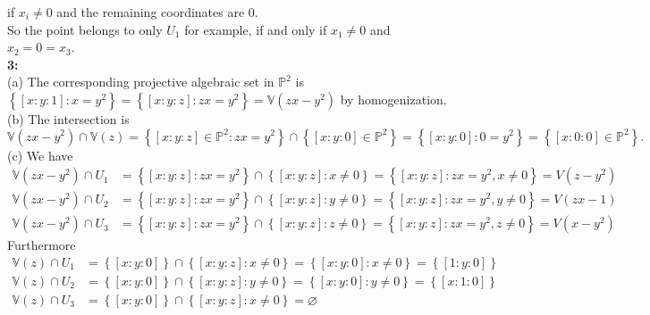 \documentclass[a4paper]{article}
\begin{document}
    if  $x_i \neq 0$ and the remaining coordinates are $0$.\\
   So the point belongs to only $U_1$ for example, if 
   and only if
   $x_1 \neq 0$ and $x_2 = 0 = x_3$.\\
   \linebreak
   \textbf{3:} \\
   (a) The corresponding projective algebraic set in $\mathbb{P}^2$ 
   is $\left\{ \left[ x  \colon y  \colon 1 \right]  \colon
   x = y^2 \right\} =
   \left\{ \left[ x  \colon y  \colon z \right]  \colon
   z x = y^2 \right\} =
   \mathbb{V} \left( zx - y^2 \right) $ by homogenization.\\
   \linebreak
   (b) The intersection is
   \[
   \mathbb{V}(zx - y^2) \cap \mathbb{V}(z) =
   \left\{ \left[ x  \colon y  \colon z \right]  \in \mathbb{P}^2  \colon
   zx = y^2     \right\} \cap \left\{ \left[ x  \colon y  \colon 0 \right] \in
   \mathbb{P}^2 \right\} 
   = \left\{ \left[ x \colon y  \colon 0 \right]  \colon
   0 = y^2 \right\} =
   \left\{ \left[ x  \colon 0  \colon 0 \right] \in \mathbb{P}^2 \right\}.
   \] 
   (c) 
   We have
   \begin{align*}
       \mathbb{V}(zx - y^2) \cap U_1
       &= \left\{ \left[ x  \colon y  \colon z \right]  \colon
       zx = y^2 \right\} \cap \left\{ \left[ x \colon y  \colon z \right]  \colon
       x \neq  0 \right\} 
       = \left\{ \left[ x  \colon y  \colon z \right]  \colon
       zx = y^2 , x \neq 0 \right\}
       = V \left( z - y^2 \right) \\
       \mathbb{V}(zx - y^2) \cap U_2
       &= \left\{ \left[ x  \colon y  \colon z \right]  \colon
       zx = y^2 \right\} \cap \left\{ \left[ x \colon y  \colon z \right]  \colon
       y \neq  0 \right\} 
       = \left\{ \left[ x  \colon y  \colon z \right]  \colon
       zx = y^2 , y \neq 0 \right\}
       = V\left( zx - 1 \right) \\
       \mathbb{V}(zx - y^2) \cap U_3
       &= \left\{ \left[ x  \colon y  \colon z \right]  \colon
       zx = y^2 \right\} \cap \left\{ \left[ x \colon y  \colon z \right]  \colon
       z \neq  0 \right\} 
       = \left\{ \left[ x  \colon y  \colon z \right]  \colon
       zx = y^2 , z \neq 0 \right\}
       = V\left( x - y^2 \right) 
   \end{align*}
   Furthermore
   \begin{align*}
       \mathbb{V}(z) \cap U_1
       &= \left\{ \left[ x : y : 0 \right]  \right\} 
       \cap \left\{ \left[ x : y : z \right]  \colon x \neq 0 \right\} 
       = \left\{ \left[ x : y : 0 \right]  \colon x\neq 0 \right\}
       = \left\{ \left[ 1  : y: 0 \right]  \right\} \\
       \mathbb{V}(z) \cap U_2
       &= \left\{ \left[ x : y : 0 \right]  \right\} 
       \cap \left\{ \left[ x : y : z \right]  \colon y \neq 0 \right\} 
       = \left\{ \left[ x : y : 0 \right]  \colon y\neq 0 \right\}
       = \left\{ \left[ x : 1 : 0 \right]  \right\} \\
       \mathbb{V}(z) \cap U_3
       &= \left\{ \left[ x : y : 0 \right]  \right\} 
       \cap \left\{ \left[ x : y : z \right]  \colon x \neq 0 \right\} 
       = \varnothing
   \end{align*}
\end{document}
